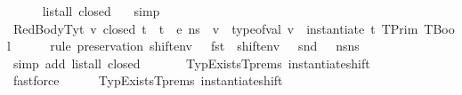 \begin{isabellebody}
\ \ \ \ \isamarkupfalse%
\ {\isacartoucheopen}list{\isacharunderscore}{\kern0pt}all\ closed\ {\isasymOmega}{\isacartoucheclose}\ \isamarkupfalse%
\ simp\isanewline
\isanewline
\ \ \isamarkupfalse%
\ RedBodyTy{\isacharcolon}{\kern0pt}{\isachardoublequoteopen}{\isasymAnd}t\ v{\isachardot}{\kern0pt}\ closed\ t\ {\isasymLongrightarrow}\ {\isasymLambda}{\isacharcomma}{\kern0pt}{\isasymGamma}{\isacharcomma}{\kern0pt}t{\isacharhash}{\kern0pt}{\isasymOmega}\ {\isasymturnstile}\ {\isasymlangle}e{\isacharcomma}{\kern0pt}\ n{\isacharunderscore}{\kern0pt}s{\isasymrangle}\ {\isasymDown}\ v\ {\isasymLongrightarrow}\ type{\isacharunderscore}{\kern0pt}of{\isacharunderscore}{\kern0pt}val\ v\ {\isacharequal}{\kern0pt}\ instantiate\ {\isacharparenleft}{\kern0pt}t{\isacharhash}{\kern0pt}{\isasymOmega}{\isacharparenright}{\kern0pt}\ {\isacharparenleft}{\kern0pt}TPrim\ TBool{\isacharparenright}{\kern0pt}{\isachardoublequoteclose}\isanewline
\ \ \ \ \isamarkupfalse%
\ {\isacharparenleft}{\kern0pt}rule\ preservation{\isacharparenleft}{\kern0pt}{}{\isacharparenright}{\kern0pt}{\isacharbrackleft}{\kern0pt}\ {\isacharquery}{\kern0pt}{\isasymDelta}{\isacharequal}{\kern0pt}{\isachardoublequoteopen}{\isacharparenleft}{\kern0pt}shift{\isacharunderscore}{\kern0pt}env\ {}\ {}\ {\isacharparenleft}{\kern0pt}fst\ {\isasymDelta}{\isacharparenright}{\kern0pt}{\isacharcomma}{\kern0pt}\ shift{\isacharunderscore}{\kern0pt}env\ {}\ {}\ {\isacharparenleft}{\kern0pt}snd\ {\isasymDelta}{\isacharparenright}{\kern0pt}{\isacharparenright}{\kern0pt}{\isachardoublequoteclose}\ \ {\isacharquery}{\kern0pt}n{\isacharunderscore}{\kern0pt}s{\isacharequal}{\kern0pt}{\isachardoublequoteopen}n{\isacharunderscore}{\kern0pt}s{\isachardoublequoteclose}{\isacharbrackright}{\kern0pt}{\isacharparenright}{\kern0pt}\isanewline
\ \ \ \ \ \ \ \ \ \ \isamarkupfalse%
\ {\isacharparenleft}{\kern0pt}simp\ add{\isacharcolon}{\kern0pt}\ {\isacartoucheopen}list{\isacharunderscore}{\kern0pt}all\ closed\ {\isasymOmega}{\isacartoucheclose}{\isacharparenright}{\kern0pt}\isanewline
\ \ \ \ \isamarkupfalse%
\ TypExistsT{\isachardot}{\kern0pt}prems\ instantiate{\isacharunderscore}{\kern0pt}shift\isanewline
\ \ \ \ \ \ \ \ \ \ \isamarkupfalse%
\ fastforce\isanewline
\ \ \ \ \isamarkupfalse%
\ TypExistsT{\isachardot}{\kern0pt}prems\ instantiate{\isacharunderscore}{\kern0pt}shift\isanewline

\end{isabellebody}
